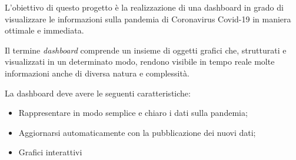
\noindent L’obiettivo di questo progetto è la realizzazione di una dashboard in grado di visualizzare le informazioni sulla pandemia di Coronavirus Covid-19 in maniera ottimale e immediata.


\noindent Il termine \emph{dashboard} comprende un insieme di oggetti grafici che, strutturati e visualizzati in un determinato modo, rendono visibile in tempo reale molte informazioni anche di diversa natura e complessità. 

\noindent La dashboard deve avere le seguenti caratteristiche:

\begin{itemize}
    \item Rappresentare in modo semplice e chiaro i dati sulla pandemia;
    \item Aggiornarsi automaticamente con la pubblicazione dei nuovi dati;
    \item Grafici interattivi
\end{itemize}